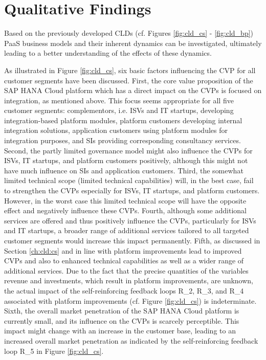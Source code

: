 \section{Qualitative Findings}\label{ch:poc:qf}

Based on the previously developed \acp{CLD} (cf. Figures \ref{fig:cld_cs} - \ref{fig:cld_bp}) \ac{PaaS} business models and their inherent dynamics can be investigated, ultimately leading to a better understanding of the effects of these dynamics.

As illustrated in Figure \ref{fig:cld_cs}, six basic factors influencing the \ac{CVP} for all customer segments have been discussed. First, the core value proposition of the SAP HANA Cloud platform which has a direct impact on the \acp{CVP} is focused on integration, as mentioned above. This focus seems appropriate for all five customer segments: complementors, i.e. \acp{ISV} and \ac{IT} startups, developing integration-based platform modules, platform customers developing internal integration solutions, application customers using platform modules for integration purposes, and \acp{SI} providing corresponding consultancy services. Second, the partly limited governance model might also influence the \acp{CVP} for \acp{ISV}, \ac{IT} startups, and platform customers positively, although this might not have much influence on \acp{SI} and application customers. Third, the somewhat limited technical scope (limited technical capabilities) will, in the best case, fail to strengthen the \acp{CVP} especially for \acp{ISV}, \ac{IT} startups, and platform customers. However, in the worst case this limited technical scope will have the opposite effect and negatively influence these \acp{CVP}. Fourth, although some additional services are offered and thus positively influence the \acp{CVP}, particularly for \acp{ISV} and \ac{IT} startups, a broader range of additional services tailored to all targeted customer segments would increase this impact permanently. Fifth, as discussed in Section \ref {ch:cld:cs} and in line with \citet[p. 200]{Evans2003} platform improvements lead to improved \acp{CVP} and also to enhanced technical capabilities as well as a wider range of additional services. Due to the fact that the precise quantities of the variables revenue and investments, which result in platform improvements, are unknown, the actual impact of the self-reinforcing feedback loops R\_2, R\_3, and R\_4 associated with platform improvements (cf. Figure \ref{fig:cld_cs}) is indeterminate. Sixth, the overall market penetration of the SAP HANA Cloud platform is currently small, and its influence on the \acp{CVP} is scarcely perceptible. This impact might change with an increase in the customer base, leading to an increased overall market penetration as indicated by the self-reinforcing feedback loop R\_5 in Figure \ref{fig:cld_cs}.

